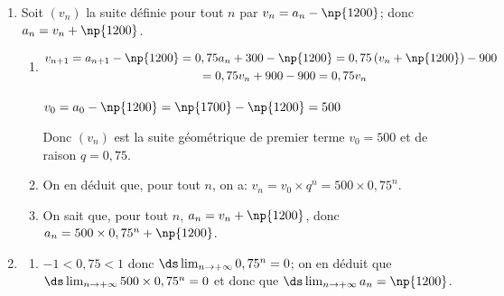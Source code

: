 \begin{enumerate}
\begin{enumerate}

On a donc démontré que, pour tout $n$, $\np{1200} \leqslant a_{n+1} \leqslant a_{n} \leqslant \np{1700}$.
		
		\item Étude de la convergence de la suite $\left(a_{n}\right)$.
		
		
La suite $(a_n)_{n\in\N}$ est décroissante et minorée donc, d'après le théorème de la convergence monotone, elle est convergente.		
		
	\end{enumerate}
\item Soit $\left(v_{n}\right)$ la suite définie pour tout $n$ par $v_{n}=a_{n}- \np{1200}$; donc $a_n=v_n+\np{1200}$.
	\begin{enumerate}
		\item 
$\begin{gathered}v_{n+1}	= a_{n+1} -\np{1200} = 0,75 a_n +300 -\np{1200}
= 0,75\left (v_n+\np{1200}\right ) -900\\
\phantom{v_{n+1}}
= 0,75 v_n +900-900 = 0,75v_n\end{gathered}$	

$v_0=a_0-\np{1200}=\np{1700} - \np{1200} = 500$

Donc $(v_n)$ est la suite géométrique de premier terme $v_0=500$ et de raison $q=0,75$.		
		\item 
On en déduit que, pour tout $n$, on a: $v_n=v_0\times q^n = 500\times  0,75^n$.
		
		\item 
On sait que, pour tout $n$, $a_n=v_n+\np{1200}$, donc 	$a_n=500\times 0,75^n+\np{1200}$.
	\end{enumerate}
\item 
	\begin{enumerate}
		\item 
$-1<0,75<1$ donc $\ds\lim_{n\to +\infty} 0,75^n=0$;
on en déduit que $\ds\lim_{n\to +\infty}500\times 0,75^n=0$
et donc que $\ds\lim_{n\to +\infty} a_n=\np{1200}$.
				

\end{enumerate}
\end{enumerate}
